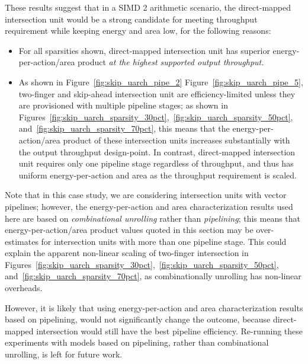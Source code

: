 These results suggest that in a SIMD 2 arithmetic scenario, the direct-mapped intersection unit would be a strong candidate for meeting throughput requirement while keeping energy and area low, for the following reasons:

\begin{itemize}
    \item For all sparsities shown, direct-mapped intersection unit has superior energy-per-action/area product \textit{at the highest supported output throughput.}
    \item As shown in Figure~\ref{fig:skip_uarch_pipe_2} Figure~\ref{fig:skip_uarch_pipe_5}, two-finger and skip-ahead intersection unit are efficiency-limited unless they are provisioned with multiple pipeline stages; as shown in Figures~\ref{fig:skip_uarch_sparsity_30pct},~\ref{fig:skip_uarch_sparsity_50pct}, and~\ref{fig:skip_uarch_sparsity_70pct}, this means that the energy-per-action/area product of these intersection units increases substantially with the output throughput design-point. In contrast, direct-mapped intersection unit requires only one pipeline stage regardless of throughput, and thus has uniform energy-per-action and area as the throughput requirement is scaled.
\end{itemize}


Note that in this case study, we are considering intersection units with vector pipelines; however, the energy-per-action and area characterization results used here are based on \textit{combinational unrolling} rather than \textit{pipelining}; this means that energy-per-action/area product values quoted in this section may be over-estimates for intersection units with more than one pipeline stage. This could explain the apparent non-linear scaling of two-finger intersection in Figures~\ref{fig:skip_uarch_sparsity_30pct},~\ref{fig:skip_uarch_sparsity_50pct}, and~\ref{fig:skip_uarch_sparsity_70pct}, as combinationally unrolling has non-linear overheads. 

However, it is likely that using energy-per-action and area characterization results based on pipelining, would not significantly change the outcome, because direct-mapped intersection would still have the best pipeline efficiency. Re-running these experiments with models based on pipelining, rather than combinational unrolling, is left for future work.